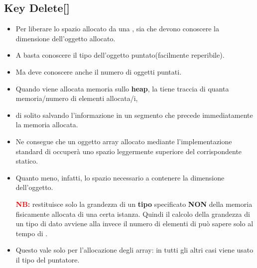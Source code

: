 \subsection{Key Delete[]}
\begin{itemize}
    \item Per liberare lo spazio allocato da una \textcolor{blue}{}, sia \textcolor{blue}{} che \textcolor{blue}{} devono conoscere la dimensione dell’oggetto
    allocato.
    \item A \textcolor{blue}{} basta conoscere il tipo dell’oggetto puntato(facilmente reperibile).
    \item Ma \textcolor{blue}{} deve conoscere anche il numero di
    oggetti puntati.
    \item Quando viene allocata memoria sullo \textbf{heap}, la \textcolor{blue}{} tiene traccia di quanta memoria/numero di elementi
    allocata/i,
    \item di solito salvando l’informazione in un segmento che
    precede immediatamente la memoria allocata.
    \item Ne consegue che un oggetto array allocato mediante
    l’implementazione standard di \textcolor{blue}{} occuperà uno spazio
    leggermente superiore del corrispondente statico.
    \item Quanto meno, infatti, lo spazio necessario a contenere la
    dimensione dell’oggetto.
    \begin{tcolorbox}[width=\linewidth, boxsep=6pt]
    \textcolor{red}{\textbf{NB:}} \textcolor{blue}{\textbf{}} restituisce solo la grandezza di un \textbf{tipo} specificato \textbf{NON} della memoria fisicamente allocata di una certa istanza. \newline\newline Quindi il calcolo della grandezza di un  tipo di dato avviene alla \textbf{\textcolor{blue}{}} invece il numero di elementi di può sapere solo al tempo di \textbf{\textcolor{blue}{}}.
    \end{tcolorbox}
    \item Questo vale solo per l’allocazione degli array: in tutti gli
    altri casi viene usato il tipo del puntatore.
\end{itemize}

